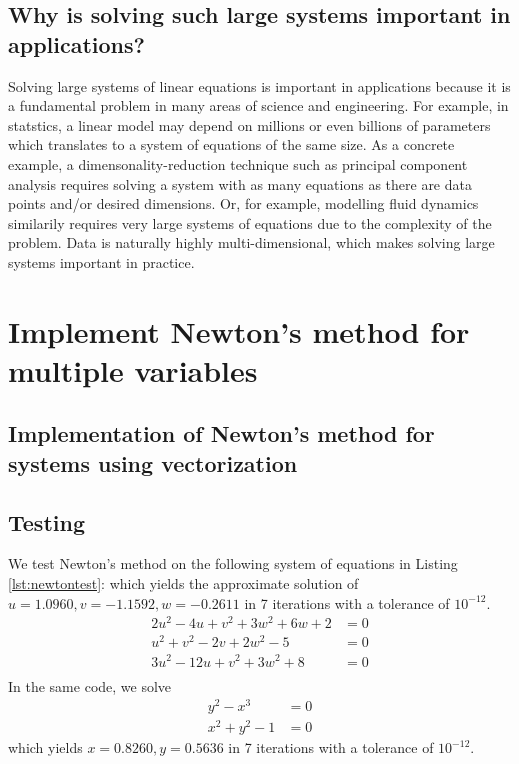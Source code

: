 \documentclass[11pt]{article}
\begin{document}
\subsection{Why is solving such large systems important in applications?}

Solving large systems of linear equations is important in applications because it is a fundamental problem in many areas of science and engineering. For example, in statstics, a linear model may depend on millions or even billions of parameters which translates to a system of equations of the same size. As a concrete example, a dimensonality-reduction technique such as principal component analysis requires solving a system with as many equations as there are data points and/or desired dimensions. Or, for example, modelling fluid dynamics similarily requires very large systems of equations due to the complexity of the problem. Data is naturally highly multi-dimensional, which makes solving large systems important in practice.

\section{Implement Newton's method for multiple variables}


\subsection{Implementation of Newton's method for systems using vectorization}



\subsection{Testing}

We test Newton's method on the following system of equations in Listing \ref{lst:newtontest}: which yields the approximate solution of $u = 1.0960, v = -1.1592, w = -0.2611$ in 7 iterations with a tolerance of $10^{-12}$.
\begin{equation}
\begin{aligned}
  2u^2 - 4u + v^2 + 3w^2 + 6w + 2 &= 0 \\
  u^2 + v^2 - 2v + 2w^2 - 5 &= 0 \\
  3u^2 - 12u + v^2 + 3w^2 + 8 &= 0 \\
\end{aligned}
\end{equation}
In the same code, we solve
\begin{equation}
\begin{aligned}
  y^2 - x^3 &= 0 \\
  x^2 + y^2 - 1 &= 0 
\end{aligned}
\end{equation}
which yields $x = 0.8260, y = 0.5636$ in 7 iterations with a tolerance of $10^{-12}$.
\end{document}
